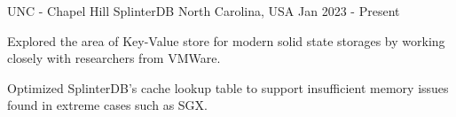

\begin{cventries}

  \cventry
    {UNC - Chapel Hill} %
    {SplinterDB} %
    {North Carolina, USA} %
    {Jan 2023 - Present} %
    {
      \begin{cvitems} %
        \item {Explored the area of Key-Value store for modern solid state storages by working closely with researchers from VMWare.}
        \item {Optimized SplinterDB's cache lookup table to support insufficient memory issues found in extreme cases such as SGX.}
      \end{cvitems}
    }

    

\end{cventries}

